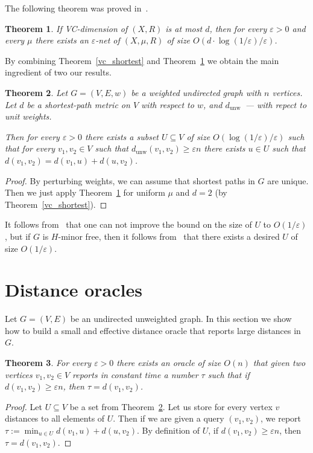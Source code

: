 \documentclass[12pt]{article}
\newcommand{\dunw}{d_{\mathrm{unw}}}
\newcommand{\eps}{\varepsilon}
\newtheorem{theorem}{Theorem}
\begin{document}
    The following theorem was proved in~\cite{HW86}.

    \begin{theorem}
        \label{eps_nets}
        If VC-dimension of $(X, R)$ is at most $d$, then for every $\eps > 0$ and every $\mu$ there exists an $\eps$-net of $(X, \mu, R)$ of size 
        $O(d \cdot \log(1 / \eps) / \eps)$.
    \end{theorem}

    By combining Theorem~\ref{vc_shortest} and Theorem~\ref{eps_nets} we obtain the main ingredient of two our results.

    \begin{theorem}
        \label{hitting_set}
        Let $G = (V, E, w)$ be a weighted undirected graph with $n$ vertices.
        Let $d$ be a shortest-path metric on $V$ with respect to $w$, and $\dunw$~--- with repect to unit weights.

        Then for every $\eps > 0$ there exists a subset $U \subseteq V$ of size $O(\log(1 / \eps) / \eps)$
        such that for every $v_1, v_2 \in V$ such that $\dunw(v_1, v_2) \geq \eps n$
        there exists $u \in U$ such that $d(v_1, v_2) = d(v_1, u) + d(u, v_2)$.
    \end{theorem}
    \begin{proof}
        By perturbing weights, we can assume that shortest paths in $G$ are unique. Then we just apply Theorem~\ref{eps_nets} for uniform $\mu$
        and $d = 2$ (by Theorem~\ref{vc_shortest}).
    \end{proof}

    It follows from~\cite{A10} that one can not improve the bound on the size of $U$ to $O(1 / \eps)$, but if $G$ is $H$-minor
    free, then it follows from~\cite{KPR93} that there exists a desired $U$ of size $O(1 / \eps)$.
    \section{Distance oracles}
    \label{data_structure}

    Let $G = (V, E)$ be an undirected unweighted graph. In this section we show how to build a small and effective distance oracle 
    that reports large distances in $G$.

    \begin{theorem}
        \label{simple_oracle}
        For every $\eps > 0$
        there exists an oracle of size $O(n)$ that given two vertices $v_1, v_2 \in V$ reports in constant time
        a number $\tau$ such that if $d(v_1, v_2) \geq \eps n$, then
        $\tau = d(v_1, v_2)$.
    \end{theorem}
    \begin{proof}
        Let $U \subseteq V$ be a set from Theorem~\ref{hitting_set}.
        Let us store for every vertex $v$ distances to all elements of $U$.
        Then if we are given a query $(v_1, v_2)$, we report $\tau := \min_{u \in U} d(v_1, u) + d(u, v_2)$. By definition of $U$, if $d(v_1, v_2) \geq \eps n$,
        then $\tau = d(v_1, v_2)$.
    \end{proof}
\end{document}

